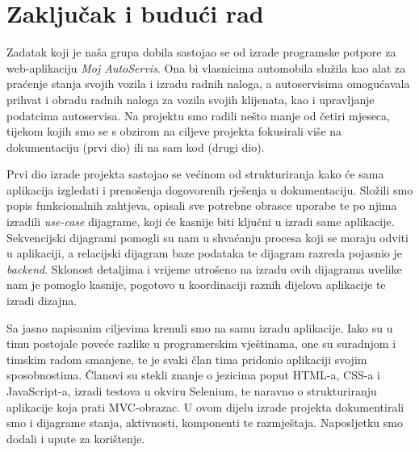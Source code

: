 \chapter{Zaključak i budući rad}
		
		
		
		 
		 Zadatak koji je naša grupa dobila sastojao se od izrade programske potpore za web-aplikaciju \textit{Moj AutoServis}. Ona bi vlasnicima automobila služila kao alat za praćenje stanja svojih vozila i izradu radnih naloga, a autoservisima omogućavala prihvat i obradu radnih naloga za vozila svojih klijenata, kao i upravljanje podatcima autoservisa. Na projektu smo radili nešto manje od četiri mjeseca, tijekom kojih smo se s obzirom na ciljeve projekta fokusirali više na dokumentaciju (prvi dio) ili na sam kod (drugi dio).
		 
		 Prvi dio izrade projekta sastojao se većinom od strukturiranja kako će sama aplikacija izgledati i prenošenja dogovorenih rješenja u dokumentaciju. Složili smo popis funkcionalnih zahtjeva, opisali sve potrebne obrasce uporabe te po njima izradili \textit{use-case} dijagrame, koji će kasnije biti ključni u izradi same aplikacije. Sekvencijski dijagrami pomogli su nam u shvaćanju procesa koji se moraju odviti u aplikaciji, a relacijski dijagram baze podataka te dijagram razreda pojasnio je \textit{backend}. Sklonost detaljima i vrijeme utrošeno na izradu ovih dijagrama uvelike nam je pomoglo kasnije, pogotovo u koordinaciji raznih dijelova aplikacije te izradi dizajna.
		 
		 Sa jasno napisanim ciljevima krenuli smo na samu izradu aplikacije. Iako su u timu postojale poveće razlike u programerskim vještinama, one su suradnjom i timskim radom smanjene, te je svaki član tima pridonio aplikaciji svojim sposobnostima. Članovi su stekli znanje o jezicima poput HTML-a, CSS-a i JavaScript-a, izradi testova u okviru Selenium, te naravno o strukturiranju aplikacije koja prati MVC-obrazac. U ovom dijelu izrade projekta dokumentirali smo i dijagrame stanja, aktivnosti, komponenti te razmještaja. Naposljetku smo dodali i upute za korištenje. 
		 

